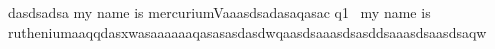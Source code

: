 dasdsadsa
my name is mercuriumVaaasdsadasaqasac 	q1~
my name is rutheniumaaqqdasxwasaaaaaaqasasasdasdwqaasdsaaasdsasddsaaasdsaasdsaqw